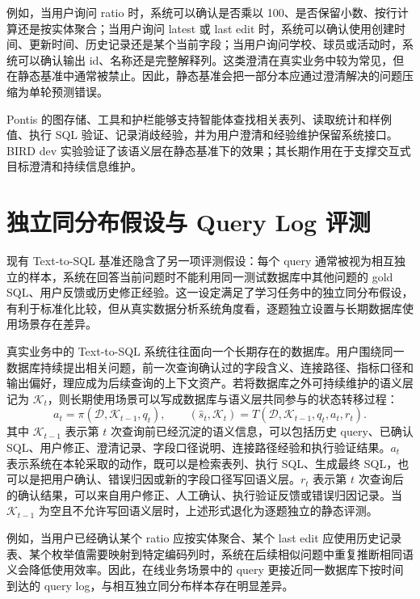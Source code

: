 \documentclass[
    bachelor,
    pdflinks,
]{xjtuthesis}
\begin{document}
例如，当用户询问 ratio 时，系统可以确认是否乘以 100、是否保留小数、按行计算还是按实体聚合；当用户询问 latest 或 last edit 时，系统可以确认使用创建时间、更新时间、历史记录还是某个当前字段；当用户询问学校、球员或活动时，系统可以确认输出 id、名称还是完整解释列。这类澄清在真实业务中较为常见，但在静态基准中通常被禁止。因此，静态基准会把一部分本应通过澄清解决的问题压缩为单轮预测错误。

Pontis 的图存储、工具和护栏能够支持智能体查找相关表列、读取统计和样例值、执行 SQL 验证、记录消歧经验，并为用户澄清和经验维护保留系统接口。BIRD dev 实验验证了该语义层在静态基准下的效果；其长期作用在于支撑交互式目标澄清和持续信息维护。

\section{独立同分布假设与 Query Log 评测}

现有 Text-to-SQL 基准还隐含了另一项评测假设：每个 query 通常被视为相互独立的样本，系统在回答当前问题时不能利用同一测试数据库中其他问题的 gold SQL、用户反馈或历史修正经验。这一设定满足了学习任务中的独立同分布假设，有利于标准化比较，但从真实数据分析系统角度看，逐题独立设置与长期数据库使用场景存在差异。

真实业务中的 Text-to-SQL 系统往往面向一个长期存在的数据库。用户围绕同一数据库持续提出相关问题，前一次查询确认过的字段含义、连接路径、指标口径和输出偏好，理应成为后续查询的上下文资产。若将数据库之外可持续维护的语义层记为 $\mathcal{K}_t$，则长期使用场景可以写成数据库与语义层共同参与的状态转移过程：
\begin{equation}
a_t=\pi(\mathcal{D},\mathcal{K}_{t-1},q_t),\qquad
(\hat{s}_t,\mathcal{K}_t)=T(\mathcal{D},\mathcal{K}_{t-1},q_t,a_t,r_t).
\end{equation}
其中 $\mathcal{K}_{t-1}$ 表示第 $t$ 次查询前已经沉淀的语义信息，可以包括历史 query、已确认 SQL、用户修正、澄清记录、字段口径说明、连接路径经验和执行验证结果。$a_t$ 表示系统在本轮采取的动作，既可以是检索表列、执行 SQL、生成最终 SQL，也可以是把用户确认、错误归因或新的字段口径写回语义层。$r_t$ 表示第 $t$ 次查询后的确认结果，可以来自用户修正、人工确认、执行验证反馈或错误归因记录。当 $\mathcal{K}_{t-1}$ 为空且不允许写回语义层时，上述形式退化为逐题独立的静态评测。

例如，当用户已经确认某个 ratio 应按实体聚合、某个 last edit 应使用历史记录表、某个枚举值需要映射到特定编码列时，系统在后续相似问题中重复推断相同语义会降低使用效率。因此，在线业务场景中的 query 更接近同一数据库下按时间到达的 query log，与相互独立同分布样本存在明显差异。
\end{document}
